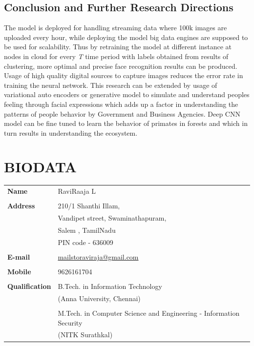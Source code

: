 \documentclass[a4paper,12pt, twoside]{NITKReport}
\begin{document}
\section{Conclusion and Further Research Directions}
\par The model is deployed for handling streaming data where 100k images are uploaded every hour, while deploying the model big data engines are supposed to be used for scalability. Thus by retraining the model at different instance at nodes in cloud for every \textit{T} time period with labels obtained from results of clustering, more optimal and precise face recognition results can be produced. Usage of high quality digital sources to capture images reduces the error rate in training the neural network. This research can be extended by usage of variational auto encoders or generative model to simulate and understand peoples feeling through facial expressions which adds up a factor in understanding the patterns of people behavior by Government and Business Agencies. Deep CNN model can be fine tuned to learn the behavior of primates in forests and which in turn results in understanding the ecosystem.  
	





\newpage
\pagestyle{plain}
\thispagestyle{empty}
\chapter*{\centering BIODATA}

\begin{table}[htbp]
	\centering
	\begin{adjustbox}{center}	
		\begin{tabular}{p{4cm} p{7cm}}
			\textbf{Name} & RaviRaaja L\\
			&\\
			\textbf{Address} & 210/1 Shanthi Illam,\\
			& Vandipet street, Swaminathapuram,\\
			& Salem , TamilNadu\\
			& PIN code - 636009\\
			&\\
			
			\textbf{E-mail} & \href{mailto:mailstoraviraaja@gmail.com}{mailstoraviraja@gmail.com}\\
			&\\
			
			\textbf{Mobile} & 9626161704\\
			&\\
			
			\textbf{Qualification} & B.Tech. in Information Technology\\
			& (Anna University, Chennai)\\
			&\\ 
            & M.Tech. in Computer Science and Engineering - Information Security\\
			& (NITK Surathkal)\\
		\end{tabular}
	\end{adjustbox}
\end{table}
\end{document}
